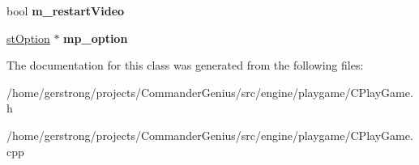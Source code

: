 \begin{DoxyCompactItemize}
\item 
\hypertarget{class_c_play_game_a35895e10b42e8de9e3a4917d4b952c7f}{
bool {\bfseries m\_\-restartVideo}}
\label{class_c_play_game_a35895e10b42e8de9e3a4917d4b952c7f}

\item 
\hypertarget{class_c_play_game_a4749e2bc0a3dcfeb4ff2431dd34b3e94}{
\hyperlink{structst_option}{stOption} $\ast$ {\bfseries mp\_\-option}}
\label{class_c_play_game_a4749e2bc0a3dcfeb4ff2431dd34b3e94}

\end{DoxyCompactItemize}


The documentation for this class was generated from the following files:\begin{DoxyCompactItemize}
\item 
/home/gerstrong/projects/CommanderGenius/src/engine/playgame/CPlayGame.h\item 
/home/gerstrong/projects/CommanderGenius/src/engine/playgame/CPlayGame.cpp\end{DoxyCompactItemize}
